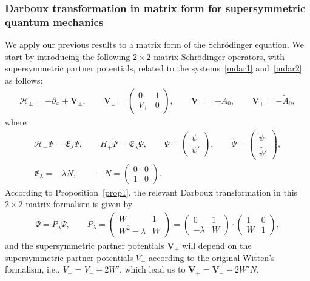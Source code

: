 \documentclass[pdftex]{sigma}%
\numberwithin{equation}{section}
\begin{document}
\subsubsection[Darboux transformation in matrix form for supersymmetric quantum mechanics]
{Darboux transformation in matrix form for supersymmetric \\quantum mechanics}
We apply our previous results to a {matrix form} of the Schr\"odinger equation. We start by introducing the following $2\times 2$ matrix Schr\"odinger operators, with supersymmetric partner potentials, related to the systems~\eqref{mdar1} and~\eqref{mdar2} as follows:
\begin{gather*}
\mathcal H_\pm=-\partial_x+\mathbf{V}_\pm,\qquad
\mathbf{V}_{\pm} =\begin{pmatrix}0&1\\V_{\pm}&0\end{pmatrix}\!,\qquad
\mathbf{V}_{-}=-A_0,\qquad
\mathbf{V}_{+}=-\widetilde{A}_0,
\end{gather*}
where
\begin{gather*}
\mathcal H_-\Psi=\mathfrak{E}_{\lambda} \Psi,\qquad
H_+\widetilde{\Psi}=\mathfrak{E}_{\lambda} \widetilde{\Psi}, \qquad
\Psi=\begin{pmatrix} \psi\\ \psi'\end{pmatrix}\!,\qquad
\widetilde{\Psi}=\begin{pmatrix} \widetilde{\psi}\\ \widetilde{\psi'}\end{pmatrix}\!,\\ \mathfrak{E}_{\lambda}=-\lambda N,\qquad
-N=\begin{pmatrix}0&0\\1&0\end{pmatrix}\!.
\end{gather*}
According to Proposition~\ref{prop1}, the relevant Darboux transformation in this $2\times 2$ matrix formalism is given by
\begin{gather*}
\widetilde{\Psi}=P_\lambda\Psi,	\qquad
P_\lambda=\begin{pmatrix}W&1\\W^2-\lambda&W \end{pmatrix}=
\begin{pmatrix} 0 & 1 \\ -\lambda&W\end{pmatrix}\cdot \begin{pmatrix} 1&0\\W&1\end{pmatrix}\!,
\end{gather*}
and the supersymmetric partner potentials $\mathbf{V}_\pm$ will depend on the supersymmetric partner potentials $V_\pm$ according to the original Witten's formalism, i.e., $V_+=V_-+2W'$, which lead us to $\mathbf{V}_+=\mathbf{V}_--2W'N$.
\end{document}
